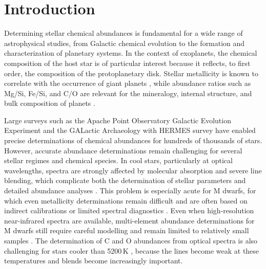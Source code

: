 \documentclass{aa}
\begin{document}

\maketitle



\section{Introduction}

Determining stellar chemical abundances is fundamental for a wide range of astrophysical studies, from Galactic chemical evolution to the formation and characterization of planetary systems.  In the context of exoplanets, the chemical composition of the host star is of particular interest because it reflects, to first order, the composition of the protoplanetary disk. Stellar metallicity is known to correlate with the occurrence of giant planets \citep{Santos-04, FischerValenti-05, Adibekyan-19}, while abundance ratios such as Mg/Si, Fe/Si, and C/O are relevant for the mineralogy, internal structure, and bulk composition of planets \citep{Bond-10, Dorn-15, Wang-19, Adibekyan-21, DelgadoMena-21}. 

Large surveys such as the Apache Point Observatory Galactic Evolution Experiment \citep[APOGEE;][]{Abdurrouf-22} and the GALactic Archaeology with HERMES survey \citep[GALAH;][]{Buder-25} have enabled precise determinations of chemical abundances for hundreds of thousands of stars. However, accurate abundance determinations remain challenging for several stellar regimes and chemical species. In cool stars, particularly at optical wavelengths, spectra are strongly affected by molecular absorption and severe line blending, which complicate both the determination of stellar parameters and detailed abundance analyses \citep{Woolf-05, Passegger-18, Maldonado-20, Marfil-21}. This problem is especially acute for M dwarfs, for which even metallicity determinations remain difficult and are often based on indirect calibrations or limited spectral diagnostics \citep{Neves-12, Rojas-Ayala-12, Mann-13, Antoniadis-Karnavas-24, Duque-Arribas-25}. Even when high-resolution near-infrared spectra are available, multi-element abundance determinations for M dwarfs still require careful modelling and remain limited to relatively small samples \citep{Souto-22, Vilar-25, Olander-25}. The determination of C and O abundances from optical spectra is also challenging for stars cooler than 5200\,K \citep{DelgadoMena-21}, because the lines become weak at these temperatures and blends become increasingly important.
\end{document}
